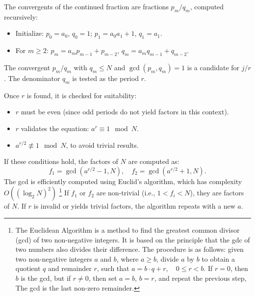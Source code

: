 \documentclass[conference,twoside]{IEEEtran}
\begin{document}
The convergents of the continued fraction are fractions \( p_m / q_m \), computed recursively:
\begin{itemize}
    \item Initialize: \( p_0 = a_0 \), \( q_0 = 1 \); \( p_1 = a_0 a_1 + 1 \), \( q_1 = a_1 \).
    \item For \( m \geq 2 \): \( p_m = a_m p_{m-1} + p_{m-2} \), \( q_m = a_m q_{m-1} + q_{m-2} \).
\end{itemize}
The convergent \( p_m / q_m \) with \( q_m \leq N \) and \( \gcd(p_m, q_m) = 1 \) is a candidate for \( j/r \). The denominator \( q_m \) is tested as the period \( r \).

Once \( r \) is found, it is checked for suitability:
\begin{itemize}
    \item \( r \) must be even (since odd periods do not yield factors in this context).
    \item \( r \) validates the equation: \( a^{r} \equiv 1 \mod N \).
    \item \( a^{r/2} \not\equiv 1 \mod N \), to avoid trivial results.
\end{itemize}
If these conditions hold, the factors of \( N \) are computed as:
\begin{equation}
f_1 = \gcd(a^{r/2} - 1, N), \quad f_2 = \gcd(a^{r/2} + 1, N).
\end{equation}
The gcd is efficiently computed using Euclid’s algorithm, which has complexity \( O((\log_2 N)^2) \) \footnote{The Euclidean Algorithm is a method to find the greatest common divisor (gcd) of two non-negative integers. It is based on the principle that the gdc of two numbers also divides their difference. The procedure is as follows: given two non-negative integers \(a\) and \(b\), where \(a \geq b\), divide \(a\) by \(b\) to obtain a quotient \(q\) and remainder \(r\), such that \( a = b \cdot q + r, \quad 0 \leq r < b\). If \(r = 0\), then \(b\) is the gcd, but if \(r \neq 0\), then set \(a = b\), \(b = r\), and repeat the previous step, The gcd is the last non-zero remainder.}  If \( f_1 \) or \( f_2 \) are non-trivial (i.e., \( 1 < f_i < N \)), they are factors of \( N \). If \( r \) is invalid or yields trivial factors, the algorithm repeats with a new \( a \).
\end{document}
